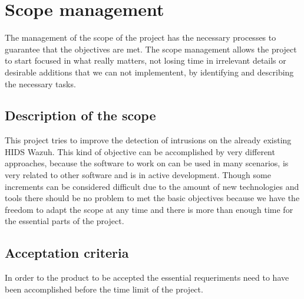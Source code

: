\section{Scope management}
The management of the scope of the project has the necessary processes to guarantee that the objectives are met.
The scope management allows the project to start focused in what really matters, not losing time in irrelevant details or desirable additions that we can not implementent, by identifying and describing the necessary tasks.


\subsection{Description of the scope}
This project tries to improve the detection of intrusions on the already existing HIDS Wazuh. This kind of objective can be accomplished by very different approaches, because the software to work on can be used in many scenarios, is very related to other software and is in active development.
\linej
Though some increments can be considered difficult due to the amount of new technologies and tools there should be no problem to met the basic objectives because we have the freedom to adapt the scope at any time and there is more than enough time for the essential parts of the project.

\subsection{Acceptation criteria}
In order to the product to be accepted the essential requeriments need to have been accomplished before the time limit of the project.

